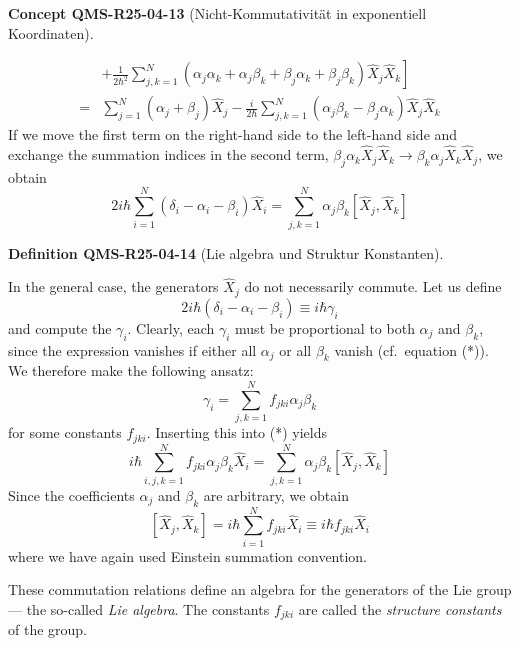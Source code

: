 \documentclass[10pt, letterpaper]{article}
\newcommand{\CustomHeading}[3]{%
  \par\medskip\noindent%
  \textbf{#1 #2} \textnormal{(#3)}.\enskip%
}
\newenvironment{DEF}[2]{\begin{unitbox}\CustomHeading{Definition}{#1}{#2}}{\end{unitbox}}
\newenvironment{CONC}[2]{\begin{unitbox}\CustomHeading{Concept}{#1}{#2}}{\end{unitbox}}
\begin{document}
\begin{CONC}{QMS-R25-04-13}{Nicht-Kommutativität in exponentiell Koordinaten}
$$\begin{aligned}
& \left.+\frac{1}{2 \hbar^{2}} \sum_{j, k=1}^{N}\left(\alpha_{j} \alpha_{k}+\alpha_{j} \beta_{k}+\beta_{j} \alpha_{k}+\beta_{j} \beta_{k}\right) \hat{X}_{j} \hat{X}_{k}\right] \\
= & \sum_{j=1}^{N}\left(\alpha_{j}+\beta_{j}\right) \hat{X}_{j}-\frac{i}{2 \hbar} \sum_{j, k=1}^{N}\left(\alpha_{j} \beta_{k}-\beta_{j} \alpha_{k}\right) \hat{X}_{j} \hat{X}_{k}
\end{aligned}
$$
If we move the first term on the right-hand side to the left-hand side and exchange the summation indices in the second term, 
$\beta_{j} \alpha_{k} \hat{X}_{j} \hat{X}_{k} \rightarrow \beta_{k} \alpha_{j} \hat{X}_{k} \hat{X}_{j}$, we obtain
\begin{equation}
2 i \hbar \sum_{i=1}^{N}(\delta_{i}-\alpha_{i}-\beta_{i}) \hat{X}_{i} = \sum_{j,k=1}^{N} \alpha_{j} \beta_{k}[\hat{X}_{j}, \hat{X}_{k}]
\tag{*}
\end{equation}
\end{CONC}


\begin{DEF}{QMS-R25-04-14}{Lie algebra und Struktur Konstanten}
In the general case, the generators $\hat{X}_{j}$ do not necessarily commute. Let us define
\[
2 i \hbar(\delta_{i}-\alpha_{i}-\beta_{i}) \equiv i \hbar \gamma_{i}
\]
and compute the $\gamma_{i}$. Clearly, each $\gamma_i$ must be proportional to both $\alpha_{j}$ and $\beta_{k}$, since the expression vanishes if either all $\alpha_{j}$ or all $\beta_{k}$ vanish (cf.\ equation (*)). We therefore make the following ansatz:
\[
\gamma_{i} = \sum_{j,k=1}^{N} f_{jki} \alpha_{j} \beta_{k}
\]
for some constants $f_{jki}$. Inserting this into (*) yields
\[
i \hbar \sum_{i,j,k=1}^{N} f_{jki} \alpha_{j} \beta_{k} \hat{X}_{i} = \sum_{j,k=1}^{N} \alpha_{j} \beta_{k} [\hat{X}_{j}, \hat{X}_{k}]
\]
Since the coefficients $\alpha_j$ and $\beta_k$ are arbitrary, we obtain
\[
[\hat{X}_{j}, \hat{X}_{k}] = i \hbar \sum_{i=1}^{N} f_{jki} \hat{X}_{i} \equiv i \hbar f_{jki} \hat{X}_{i}
\]
where we have again used Einstein summation convention.

These commutation relations define an algebra for the generators of the Lie group — the so-called \emph{Lie algebra}. The constants $f_{jki}$ are called the \emph{structure constants} of the group.
\end{DEF}
\end{document}
